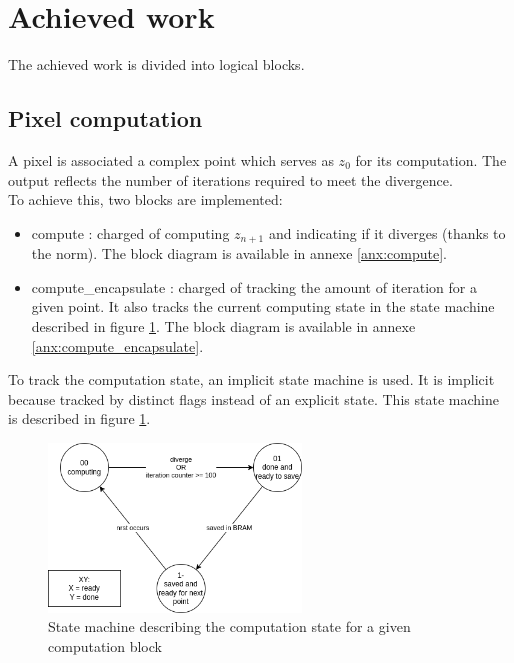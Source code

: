 \section{Achieved work}
    The achieved work is divided into logical blocks.
    \subsection{Pixel computation}
        A pixel is associated a complex point which serves as $z_0$ for its computation.
        The output reflects the number of iterations required to meet the divergence.\\
        To achieve this, two blocks are implemented:
        \begin{itemize}
            \item compute : charged of computing $z_{n+1}$ and indicating if it diverges (thanks to the norm).
                The block diagram is available in annexe \ref{anx:compute}.
            \item compute\_encapsulate : charged of tracking the amount of iteration for a given point.
                It also tracks the current computing state in the state machine described in figure \ref{fig:compute_state_diagram}.
                The block diagram is available in annexe \ref{anx:compute_encapsulate}.
        \end{itemize}
        To track the computation state, an implicit state machine is used.
        It is implicit because tracked by distinct flags instead of an explicit state.
        This state machine is described in figure \ref{fig:compute_state_diagram}.
        \begin{figure}[H]
            \centering
            \includegraphics[width=0.6\textwidth]{images/compute_state_diagram.png}
            \caption{State machine describing the computation state for a given computation block}
            \label{fig:compute_state_diagram}
        \end{figure}
